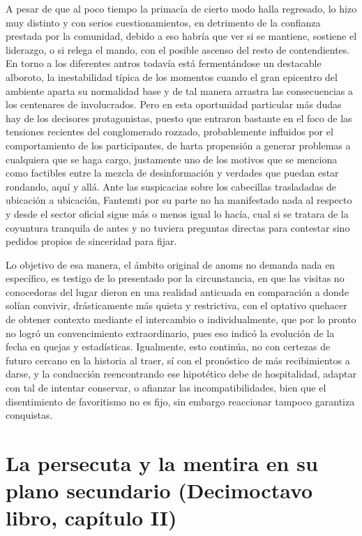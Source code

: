 \documentclass[
]{book}
\begin{document}
A pesar de que al poco tiempo la primacía de cierto modo halla regresado, lo hizo muy distinto y con serios cuestionamientos, en detrimento de la confianza prestada por la comunidad, debido a eso habría que ver si se mantiene, sostiene el liderazgo, o si relega el mando, con el posible ascenso del resto de contendientes. En torno a los diferentes antros todavía está fermentándose un destacable alboroto, la inestabilidad típica de los momentos cuando el gran epicentro del ambiente aparta su normalidad base y de tal manera arrastra las consecuencias a los centenares de involucrados. Pero en esta oportunidad particular más dudas hay de los decisores protagonistas, puesto que entraron bastante en el foco de las tensiones recientes del conglomerado rozzado, probablemente influidos por el comportamiento de los participantes, de harta propensión a generar problemas a cualquiera que se haga cargo, justamente uno de los motivos que se menciona como factibles entre la mezcla de desinformación y verdades que puedan estar rondando, aquí y allá. Ante las suspicacias sobre los cabecillas trasladadas de ubicación a ubicación, Fantemti por su parte no ha manifestado nada al respecto y desde el sector oficial sigue más o menos igual lo hacía, cual si se tratara de la coyuntura tranquila de antes y no tuviera preguntas directas para contestar sino pedidos propios de sinceridad para fijar.

Lo objetivo de esa manera, el ámbito original de anoms no demanda nada en específico, es testigo de lo presentado por la circunstancia, en que las visitas no conocedoras del lugar dieron en una realidad anticuada en comparación a donde solían convivir, drásticamente más quieta y restrictiva, con el optativo quehacer de obtener contexto mediante el intercambio o individualmente, que por lo pronto no logró un convencimiento extraordinario, pues eso indicó la evolución de la fecha en quejas y estadísticas. Igualmente, esto continúa, no con certezas de futuro cercano en la historia al traer, sí con el pronóstico de más recibimientos a darse, y la conducción reencontrando ese hipotético debe de hospitalidad, adaptar con tal de intentar conservar, o afianzar las incompatibilidades, bien que el disentimiento de favoritismo no es fijo, sin embargo reaccionar tampoco garantiza conquistas.

\hypertarget{la-persecuta-y-la-mentira-en-su-plano-secundario-decimoctavo-libro-capuxedtulo-ii}{%
\section{La persecuta y la mentira en su plano secundario (Decimoctavo libro, capítulo II)}\label{la-persecuta-y-la-mentira-en-su-plano-secundario-decimoctavo-libro-capuxedtulo-ii}}
\end{document}
